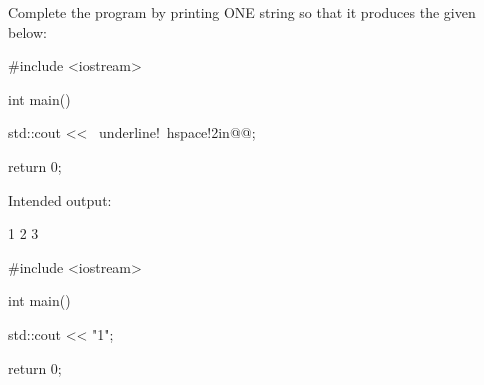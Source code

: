 \nextq
Complete the program by printing
ONE string so that
it produces the given below:
\begin{console}[commandchars=\~\!\@,fontsize=\small]
#include <iostream>

int main()
{
    std::cout << ~underline!~hspace!2in@@;

    return 0;
}
\end{console}
Intended output:
\begin{console}[fontsize=\small]
1
2
3
\end{console}
\ANSWER
\begin{answercode}
#include <iostream>

int main()
{
    std::cout << "1\n";

    return 0;
}
\end{answercode}


